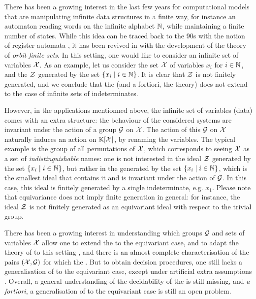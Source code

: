 \AP There has been a growing interest in the last few years for computational
models that are manipulating infinite data structures in a finite way, for
instance an automaton reading words on the infinite alphabet $\mathbb{N}$, while
maintaining a finite number of states. While this idea can be traced back to
the 90s with the notion of register automata \cite{KAFR94}, it has been revived
in with the development of the theory of \emph{orbit finite sets}. In this
setting, one would like to consider an infinite set of variables $\mathcal{X}$. As an
example, let us consider the set $\mathcal{X}$ of variables $x_i$ for $i \in \mathbb{N}$, and
the  $\mathcal{Z}$ generated by the set $\{ x_i \mid i \in \mathbb{N} \}$. It is
clear that $\mathcal{Z}$ is not finitely generated, and we conclude that the
 (and a fortiori, the 
theory) does not extend to the case of infinite sets of indeterminates.

\AP However, in the applications mentionned above, the infinite set of
variables (data) comes with an extra structure: the behaviour of the considered
systems are invariant under the action of a group $\mathcal{G}$ on $\mathcal{X}$. The action
of this $\mathcal{G}$ on $\mathcal{X}$ naturally induces an action on $\mathbb{K}[\mathcal{X}]$, by
renaming the variables. The typical example is the group of all permutations of
$\mathcal{X}$, which corresponds to seeing $\mathcal{X}$ as a set of \emph{indistinguishable}
names: one is not interested in the ideal $\mathcal{Z}$ generated by the set
$\{ x_i \mid i \in \mathbb{N} \}$, but rather in the  generated by
the set $\{ x_i \mid i \in \mathbb{N} \}$, which is the smallest ideal that contains it
and is invariant under the action of $\mathcal{G}$. In this case, this ideal is
finitely generated by a single indeterminate, e.g. $x_1$. Please note that
equivariance does not imply finite generation in general: for instance, the
ideal $\mathcal{Z}$ is not finitely generated as an equivariant ideal with respect to
the trivial group.

\AP There has been a growing interest in understanding which groups $\mathcal{G}$
and sets of variables $\mathcal{X}$ allow one to extend the 
to the equivariant case, and to adapt the theory of  to
this setting \cite{BRDR11,HISU12,HIKRLE18,GHOLAS24}, 
 and there is an almost complete
characterisation of the pairs $(\mathcal{X},\mathcal{G})$ for which the  \cite[Theorems 11 and 12]{GHOLAS24}. But to obtain
decision procedures, one still lacks a generalisation of  to the equivariant case, except under artificial extra assumptions
\cite[Section 6]{GHOLAS24}. Overall, a general understanding of the
decidability of the  is still missing,
and \emph{a fortiori}, a generalisation of  to the
equivariant case is still an open problem.

